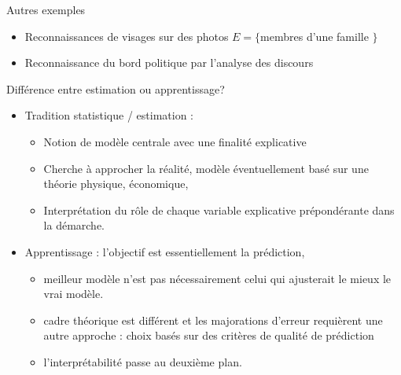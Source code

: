 \documentclass[ignorenonframetext,]{beamer}
\providecommand{\tightlist}{%
  \setlength{\itemsep}{0pt}\setlength{\parskip}{0pt}}
\begin{document}
\begin{frame}{Autres exemples}

\begin{itemize}
\tightlist
\item
  Reconnaissances de visages sur des photos \(E = \{\)membres d'une
  famille \(\}\)
\item
  Reconnaissance du bord politique par l'analyse des discours
\end{itemize}

\end{frame}

\begin{frame}{Différence entre estimation ou apprentissage?}

\begin{itemize}
\tightlist
\item
  Tradition statistique / estimation :

  \begin{itemize}
  \tightlist
  \item
    Notion de modèle centrale avec une finalité explicative
  \item
    Cherche à approcher la réalité, modèle éventuellement basé sur une
    théorie physique, économique,
  \item
    Interprétation du rôle de chaque variable explicative prépondérante
    dans la démarche.
  \end{itemize}
\item
  Apprentissage : l'objectif est essentiellement la prédiction,

  \begin{itemize}
  \tightlist
  \item
    meilleur modèle n'est pas nécessairement celui qui ajusterait le
    mieux le vrai modèle.
  \item
    cadre théorique est différent et les majorations d'erreur requièrent
    une autre approche : choix basés sur des critères de qualité de
    prédiction
  \item
    l'interprétabilité passe au deuxième plan.
  \end{itemize}
\end{itemize}

\end{frame}
\end{document}
